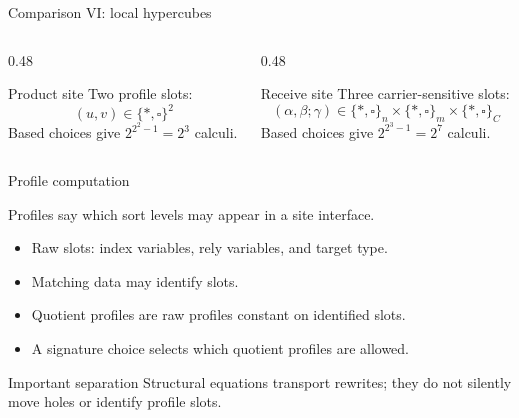 \documentclass[aspectratio=169,11pt]{beamer}
\begin{document}
\begin{frame}{Comparison VI: local hypercubes}
\begin{columns}[T]
\begin{column}{0.48\textwidth}
\begin{block}{Product site}
Two profile slots:
\[
  (u,v)\in\{\ast,\square\}^2
\]
Based choices give $2^{2^2 - 1} = 2^3$ calculi.
\end{block}

\end{column}
\begin{column}{0.48\textwidth}
\begin{block}{Receive site}
Three carrier-sensitive slots:
\[
  (\alpha,\beta;\gamma)
  \in
  \{\ast,\square\}_{n}
  \times
  \{\ast,\square\}_{m}
  \times
  \{\ast,\square\}_{C}
\]
Based choices give \(2^{2^3 - 1} = 2^ 7\) calculi.
\end{block}
\end{column}
\end{columns}
\end{frame}

\begin{frame}{Profile computation}
\begin{center}
\Large Profiles say which sort levels may appear in a site interface.
\end{center}

\vspace{0.6em}
\begin{itemize}
  \item Raw slots: index variables, rely variables, and target type.
  \item Matching data may identify slots.
  \item Quotient profiles are raw profiles constant on identified slots.
  \item A signature choice selects which quotient profiles are allowed.
\end{itemize}

\vspace{0.5em}
\begin{block}{Important separation}
Structural equations transport rewrites; they do not silently move holes or identify profile slots.
\end{block}
\end{frame}
\end{document}

